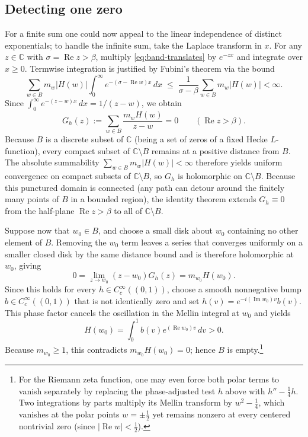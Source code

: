 \documentclass[11pt,letterpaper]{article}
\newcommand{\C}{\mathbb{C}}
\newcommand{\dd}{\,d}
\DeclareMathOperator{\RePt}{Re}
\DeclareMathOperator{\ImPt}{Im}
\begin{document}
\subsection*{Detecting one zero}

For a finite sum one could now appeal to the linear independence of distinct exponentials; to handle the infinite sum, take the Laplace transform in $x$. For any $z\in\C$ with $\sigma = \RePt z > \beta$, multiply \eqref{eq:band-translates} by $e^{-zx}$ and integrate over $x\ge 0$. Termwise integration is justified by Fubini's theorem via the bound
\[
  \sum_{w\in B} m_w|H(w)|\int_0^\infty e^{-(\sigma-\RePt w)x}\dd x
  \;\le\; \frac{1}{\sigma-\beta}\sum_{w\in B} m_w|H(w)| < \infty.
\]
Since $\int_0^\infty e^{-(z-w)x}\dd x = 1/(z-w)$, we obtain
\[
  G_h(z) := \sum_{w\in B}\frac{m_w H(w)}{z-w} = 0 \qquad (\RePt z > \beta).
\]
Because $B$ is a discrete subset of $\C$ (being a set of zeros of a fixed Hecke $L$-function), every compact subset of $\C\setminus B$ remains at a positive distance from $B$. The absolute summability $\sum_{w\in B} m_w|H(w)| < \infty$ therefore yields uniform convergence on compact subsets of $\C\setminus B$, so $G_h$ is holomorphic on $\C\setminus B$. Because this punctured domain is connected (any path can detour around the finitely many points of $B$ in a bounded region), the identity theorem extends $G_h \equiv 0$ from the half-plane $\RePt z > \beta$ to all of $\C\setminus B$.

Suppose now that $w_0\in B$, and choose a small disk about $w_0$ containing no other element of $B$. Removing the $w_0$ term leaves a series that converges uniformly on a smaller closed disk by the same distance bound and is therefore holomorphic at $w_0$, giving
\[
  0 = \lim_{z\to w_0}(z-w_0)G_h(z) = m_{w_0}H(w_0).
\]
Since this holds for every $h\in C_c^\infty((0,1))$, choose a smooth nonnegative bump $b\in C_c^\infty((0,1))$ that is not identically zero and set $h(v) = e^{-i(\ImPt w_0)v}b(v)$. This phase factor cancels the oscillation in the Mellin integral at $w_0$ and yields
\[
  H(w_0) = \int_0^1 b(v)e^{(\RePt w_0)v}\dd v > 0.
\]
Because $m_{w_0}\ge 1$, this contradicts $m_{w_0}H(w_0)=0$; hence $B$ is empty.\footnote{For the Riemann zeta function, one may even force both polar terms to vanish separately by replacing the phase-adjusted test $h$ above with $h''-\tfrac14 h$. Two integrations by parts multiply its Mellin transform by $w^2-\tfrac14$, which vanishes at the polar points $w=\pm\tfrac12$ yet remains nonzero at every centered nontrivial zero (since $|\RePt w|<\tfrac12$).}
\end{document}
